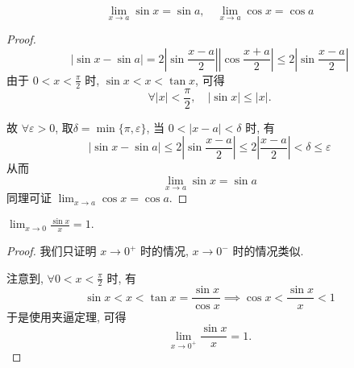 \begin{example}
    \begin{equation}
      \lim_{x \to a} \sin x = \sin a , \quad \lim_{x \to a} \cos x = \cos a
    \end{equation}
\end{example}
\begin{proof}
    \begin{equation}
      \left| \sin x - \sin a \right| = 2 \left| \sin \frac{x - a}{2} \right| \left| \cos \frac{x + a}{2} \right| \leqslant 2 \left| \sin \frac{x - a}{2} \right|
    \end{equation}
    由于 $0 < x < \frac{\pi}{2}$ 时, $\sin x < x < \tan x$, 可得
    \begin{equation}
      \forall \left| x \right| < \frac{\pi}{2}, \quad \left| \sin x \right| \le  \left| x \right|.
    \end{equation}
    
    故 $\forall \varepsilon > 0$, 取$ \delta = \min \{ \pi, \varepsilon \}$, 当 $0 < \left| x - a \right| < \delta $ 时, 有
    \begin{equation}
      \left| \sin x - \sin a \right| \le  2 \left| \sin \frac{x - a}{2} \right| \le 2 \left| \frac{x-a}{2} \right| < \delta \le  \varepsilon
    \end{equation}
    从而
    \begin{equation}
      \lim_{x \to a} \sin x = \sin a
    \end{equation}
    同理可证 $\displaystyle \lim_{x \to a} \cos x = \cos a$.
\end{proof}

\begin{proposition}
    $\displaystyle
      \lim_{x \to 0} \frac{\sin x}{x} = 1.
    $
\end{proposition}
\begin{proof}
    我们只证明 $x \to 0^{+}$ 时的情况, $x \to 0^{-}$ 时的情况类似.

    注意到, $\forall 0 < x < \frac{\pi}{2}$ 时, 有
    \begin{equation}
      \sin x < x < \tan x = \frac{\sin x}{\cos x} \implies \cos x < \frac{\sin x}{x} < 1
    \end{equation}
    于是使用夹逼定理, 可得
    \begin{equation}
      \lim_{x \to 0^{+}} \frac{\sin x}{x} = 1.
    \end{equation}
\end{proof}

